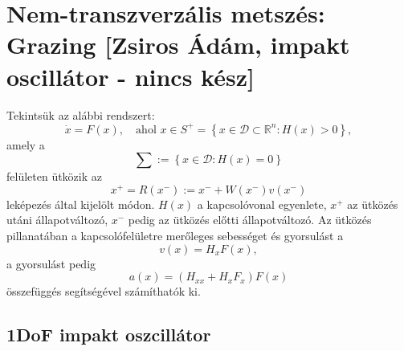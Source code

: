 

\section{Nem-transzverzális metszés: Grazing [Zsiros Ádám, impakt oscillátor - nincs kész]}

Tekintsük az alábbi rendszert:
\begin{equation}
\dot{x}=F(x), \quad \text{ahol } x\in S^+=\left\{x\in\mathcal{D}\subset\mathbb{R}^n: H(x)>0\right\},
\end{equation}
amely a 
\begin{equation}
\sum:=\left\{x\in\mathcal{D}: H(x)=0\right\}
\end{equation}
felületen ütközik az
\begin{equation}
x^+=R(x^-):=x^-+W(x^-)v(x^-)
\end{equation}
leképezés által kijelölt módon. $H(x)$ a kapcsolóvonal egyenlete, $x^+$ az ütközés utáni állapotváltozó, $x^-$ pedig az ütközés előtti állapotváltozó. Az ütközés pillanatában a kapcsolófelületre merőleges sebességet és gyorsulást a 
\begin{equation}
v(x)=H_xF(x), 
\end{equation} 
a gyorsulást pedig 
\begin{equation}
 a(x)=(H_{xx}+H_xF_x)F(x)
\end{equation} 
összefüggés segítségével számíthatók ki.

\subsection{1DoF impakt oszcillátor}


